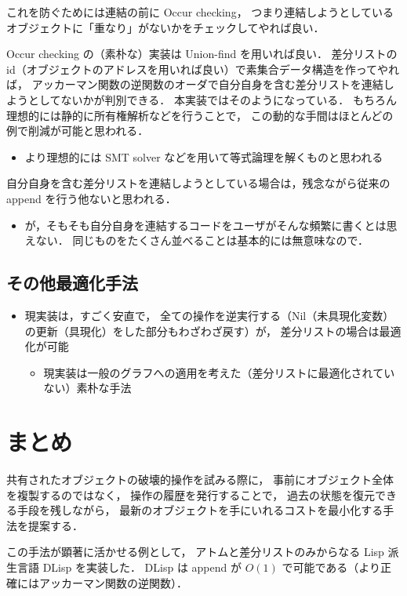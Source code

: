 \documentclass[10pt, a4j, twocolumn]{scrartcl}
\begin{document}
これを防ぐためには連結の前に Occur checking，
つまり連結しようとしているオブジェクトに「重なり」がないかをチェックしてやれば良い．

Occur checking の（素朴な）実装は Union-find を用いれば良い．
差分リストの id（オブジェクトのアドレスを用いれば良い）で素集合データ構造を作ってやれば，
アッカーマン関数の逆関数のオーダで自分自身を含む差分リストを連結しようとしてないかが判別できる．
本実装ではそのようになっている．
もちろん理想的には静的に所有権解析などを行うことで，
この動的な手間はほとんどの例で削減が可能と思われる．
\begin{itemize}
\item より理想的には SMT solver などを用いて等式論理を解くものと思われる
\end{itemize}

自分自身を含む差分リストを連結しようとしている場合は，残念ながら従来の append を行う他ないと思われる．
\begin{itemize}
\item が，そもそも自分自身を連結するコードをユーザがそんな頻繁に書くとは思えない．
同じものをたくさん並べることは基本的には無意味なので．
\end{itemize}


\subsection{その他最適化手法}
\label{sec:org20d4bd0}
\begin{itemize}
\item 現実装は，すごく安直で，
全ての操作を逆実行する（Nil（未具現化変数）の更新（具現化）をした部分もわざわざ戻す）が，
差分リストの場合は最適化が可能
\begin{itemize}
\item 現実装は一般のグラフへの適用を考えた（差分リストに最適化されていない）素朴な手法
\end{itemize}
\end{itemize}


\section{まとめ}
\label{sec:org2c07afe}

共有されたオブジェクトの破壊的操作を試みる際に，
事前にオブジェクト全体を複製するのではなく，
操作の履歴を発行することで，
過去の状態を復元できる手段を残しながら，
最新のオブジェクトを手にいれるコストを最小化する手法を提案する．

この手法が顕著に活かせる例として，
アトムと差分リストのみからなる Lisp 派生言語 DLisp を実装した．
DLisp は append が \(O(1)\) で可能である（より正確にはアッカーマン関数の逆関数）．
\end{document}
